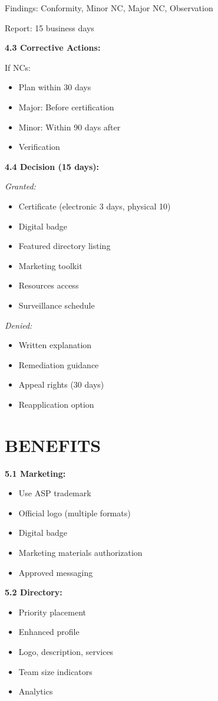 \documentclass[11pt,a4paper]{article}
\begin{document}
Findings: Conformity, Minor NC, Major NC, Observation

Report: 15 business days

\textbf{4.3 Corrective Actions:}

If NCs:
\begin{itemize}
\item Plan within 30 days
\item Major: Before certification
\item Minor: Within 90 days after
\item Verification
\end{itemize}

\textbf{4.4 Decision (15 days):}

\textit{Granted:}
\begin{itemize}
\item Certificate (electronic 3 days, physical 10)
\item Digital badge
\item Featured directory listing
\item Marketing toolkit
\item Resources access
\item Surveillance schedule
\end{itemize}

\textit{Denied:}
\begin{itemize}
\item Written explanation
\item Remediation guidance
\item Appeal rights (30 days)
\item Reapplication option
\end{itemize}

\section{BENEFITS}

\textbf{5.1 Marketing:}
\begin{itemize}
\item Use ASP trademark
\item Official logo (multiple formats)
\item Digital badge
\item Marketing materials authorization
\item Approved messaging
\end{itemize}

\textbf{5.2 Directory:}
\begin{itemize}
\item Priority placement
\item Enhanced profile
\item Logo, description, services
\item Team size indicators
\item Analytics
\end{itemize}
\end{document}
